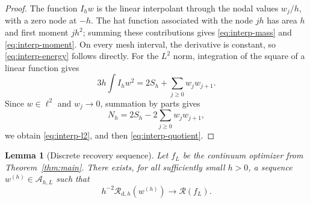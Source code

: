 \documentclass[11pt]{amsart}
\newtheorem{lemma}[theorem]{Lemma}
\theoremstyle{definition}
\theoremstyle{remark}
\newcommand{\Rcal}{\mathcal R}
\begin{document}
\begin{proof}
The function $I_hw$ is the linear interpolant through the nodal values
$w_j/h$, with a zero node at $-h$. The hat function associated with the node
$jh$ has area $h$ and first moment $jh^2$; summing these contributions gives
\eqref{eq:interp-mass} and \eqref{eq:interp-moment}. On every mesh interval,
the derivative is constant, so \eqref{eq:interp-energy} follows directly.
For the $L^2$ norm, integration of the square of a linear function gives
\[
 3h\int I_hw^2
 =2S_h+\sum_{j\geq0}w_jw_{j+1}.
\]
Since $w\in\ell^2$ and $w_j\to0$, summation by parts gives
\[
 N_h=2S_h-2\sum_{j\geq0}w_jw_{j+1},
\]
we obtain \eqref{eq:interp-l2}, and then \eqref{eq:interp-quotient}.
\end{proof}

\begin{lemma}[Discrete recovery sequence]\label{lem:discrete-recovery}
Let $f_L$ be the continuum optimizer from Theorem~\ref{thm:main}. There exists,
for all sufficiently small $h>0$, a sequence $w^{(h)}\in\mathcal A_{h,L}$ such that
\[
 h^{-2}\Rcal_{\mathrm d,h}(w^{(h)})\longrightarrow\Rcal(f_L).
\]
\end{lemma}
\end{document}
